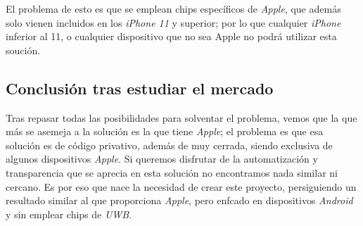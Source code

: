 El problema de esto es que se emplean chips específicos de \emph{Apple}, que
además solo vienen incluidos en los \emph{iPhone 11} y superior; por lo que
cualquier \emph{iPhone} inferior al 11, o cualquier dispositivo que no sea Apple
no podrá utilizar esta soución.

\subsection{Conclusión tras estudiar el mercado}
Tras repasar todas las posibilidades para solventar el problema, vemos que la
que más se asemeja a la solución es la que tiene \emph{Apple}; el problema es
que esa solución es de código privativo, además de muy cerrada, siendo exclusiva
de algunos dispositivos \emph{Apple}. Si queremos disfrutar de la automatización
y transparencia que se aprecia en esta solución no encontramos nada similar ni
cercano. Es por eso que nace la necesidad de crear este proyecto, persiguiendo
un resultado similar al que proporciona \emph{Apple}, pero enfcado en
dispositivos \emph{Android} y sin emplear chips de \emph{UWB}.\\
